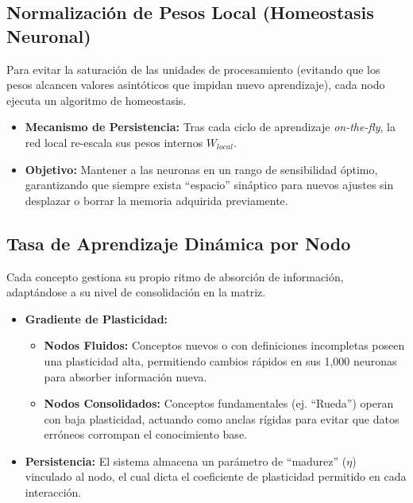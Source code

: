 \documentclass[12pt]{article}
\begin{document}
\subsection{Normalización de Pesos Local (Homeostasis Neuronal)}
Para evitar la saturación de las unidades de procesamiento (evitando que los pesos alcancen valores asintóticos que impidan nuevo aprendizaje), cada nodo ejecuta un algoritmo de homeostasis.
\begin{itemize}
    \item \textbf{Mecanismo de Persistencia:} Tras cada ciclo de aprendizaje \textit{on-the-fly}, la red local re-escala sus pesos internos $W_{local}$. 
    \item \textbf{Objetivo:} Mantener a las neuronas en un rango de sensibilidad óptimo, garantizando que siempre exista ``espacio'' sináptico para nuevos ajustes sin desplazar o borrar la memoria adquirida previamente.
\end{itemize}

\subsection{Tasa de Aprendizaje Dinámica por Nodo}
Cada concepto gestiona su propio ritmo de absorción de información, adaptándose a su nivel de consolidación en la matriz.
\begin{itemize}
    \item \textbf{Gradiente de Plasticidad:} 
    \begin{itemize}
        \item \textbf{Nodos Fluidos:} Conceptos nuevos o con definiciones incompletas poseen una plasticidad alta, permitiendo cambios rápidos en sus 1,000 neuronas para absorber información nueva.
        \item \textbf{Nodos Consolidados:} Conceptos fundamentales (ej. ``Rueda'') operan con baja plasticidad, actuando como anclas rígidas para evitar que datos erróneos corrompan el conocimiento base.
    \end{itemize}
    \item \textbf{Persistencia:} El sistema almacena un parámetro de ``madurez'' ($\eta$) vinculado al nodo, el cual dicta el coeficiente de plasticidad permitido en cada interacción.
\end{itemize}
\end{document}
